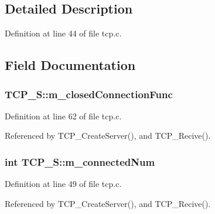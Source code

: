 \subsection{Detailed Description}


Definition at line 44 of file tcp.\+c.



\subsection{Field Documentation}
\subsubsection[{\texorpdfstring{m\+\_\+closed\+Connection\+Func}{m_closedConnectionFunc}}]{ T\+C\+P\+\_\+\+S\+::m\+\_\+closed\+Connection\+Func}\hypertarget{structTCP__S_a31a864e5f7dc9f1c70aee2dd4be25601}{}\label{structTCP__S_a31a864e5f7dc9f1c70aee2dd4be25601}


Definition at line 62 of file tcp.\+c.



Referenced by T\+C\+P\+\_\+\+Create\+Server(), and T\+C\+P\+\_\+\+Recive().

\subsubsection[{\texorpdfstring{m\+\_\+connected\+Num}{m_connectedNum}}]{\setlength{\rightskip}{0pt plus 5cm}int T\+C\+P\+\_\+\+S\+::m\+\_\+connected\+Num}\hypertarget{structTCP__S_a0022d3a92a532a6f37c10db899d6cd47}{}\label{structTCP__S_a0022d3a92a532a6f37c10db899d6cd47}


Definition at line 49 of file tcp.\+c.



Referenced by T\+C\+P\+\_\+\+Create\+Server(), and T\+C\+P\+\_\+\+Recive().

